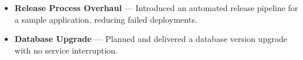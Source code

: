 
\begin{itemize}

\item \textbf{Release Process Overhaul} --- Introduced an automated release pipeline for a sample application, reducing failed deployments.

\item \textbf{Database Upgrade} --- Planned and delivered a database version upgrade with no service interruption.

\end{itemize}
